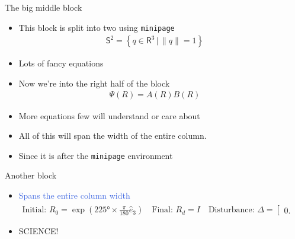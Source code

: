 \documentclass[final, usenames, dvipsnames]{beamer}
\newlength{\onecolwidth}
\newlength{\twocolwidth}
\def\Emph{\textcolor{RoyalBlue}}
\begin{document}
\begin{frame}[t]
\begin{columns}[T,onlytextwidth]
\begin{column}{\onecolwidth}
\end{column}  %

\begin{column}{\twocolwidth} %

\begin{block}{The big middle block} %
	\begin{minipage}{0.4938\columnwidth} %
	\begin{itemize}
		\item This block is split into two using \texttt{minipage}
			\begin{align*}
				\mathsf{S}^2 = \left\{q \in \mathsf{R}^3 \,  \vert \, \| q \| = 1 \right\}
			\end{align*}
		\item Lots of fancy equations
	\end{itemize}
	\end{minipage}%
	\begin{minipage}{0.4938\columnwidth}%
		\begin{itemize}
			\item Now we're into the right half of the block
				\begin{align*}
					\Psi(R) = A(R) B(R) 
				\end{align*}
			\item More equations few will understand or care about
		\end{itemize}
	\end{minipage}%
	
	\begin{itemize}
		\item All of this will span the width of the entire column.
		\item Since it is after the \texttt{minipage} environment
	\end{itemize}
\end{block} %

\begin{block}{Another block} %
	\begin{itemize}
		\item \Emph{Spans the entire column width} 
		\begin{align*}
			\text{Initial: } R_0 =  \exp(\ang{225} \times \frac{\pi}{180} \hat{e}_3) \quad \text{Final: } R_d = I \quad \text{Disturbance: } \Delta = \begin{bmatrix} 0.2 & 0.2 & 0.2 \end{bmatrix}^T
		\end{align*}
		\item SCIENCE!
	\end{itemize}
\end{block} %
\end{column}



\end{columns}
\end{frame}
\end{document}
